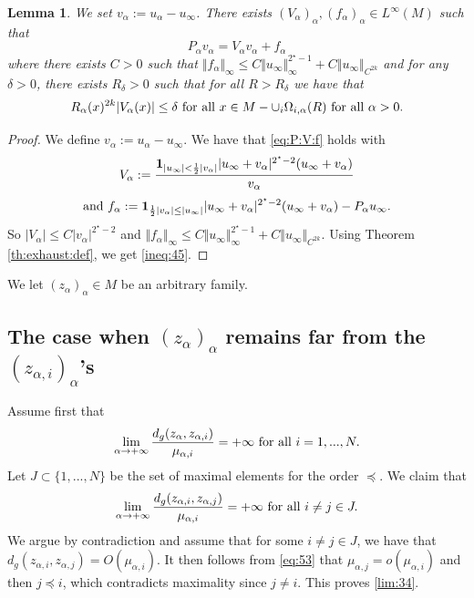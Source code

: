 \documentclass[reqno]{amsart}
\newtheorem{lemma}{Lemma}[section]
\def \crit {2^\star}
\def \ua {u_\alpha}
\def \va {v_\alpha}
\def \za {z_\alpha}
\def \mai {\mu_{\alpha,i}}
\def \maj {\mu_{\alpha,j}}
\def \zai {z_{\alpha,i}}
\def \zaj {z_{\alpha,j}}
\begin{document}
\begin{lemma}\label{step:34} We set $v_\alpha:=\ua-u_\infty $. There exists $(V_\alpha)_\alpha, (f_\alpha)_\alpha\in L^\infty(M)$ such that
\begin{equation}\label{eq:P:V:f}
P_\alpha v_\alpha= V_\alpha v_\alpha+f_\alpha
\end{equation}
where there exists $C>0$ such that $\Vert f_\alpha\Vert_\infty\leq C\Vert u_\infty \Vert_\infty^{\crit-1}+C\Vert u_\infty \Vert_{C^{2k}}$ and for  any $\delta>0$, there exists $R_\delta>0$ such that for all $R>R_\delta$ we have that
\begin{equation}\label{ineq:45}
R_\alpha(x)^{2k}|V_\alpha(x)|\leq \delta\hbox{ for all }x\in M-\cup_i\Omega_{i,\alpha}(R)\hbox{ for all }\alpha>0.
\end{equation}
\end{lemma}
\begin{proof} We define $v_\alpha:=\ua-u_\infty $. We  have that \eqref{eq:P:V:f} holds with
$$V_\alpha:=\frac{{\bf 1}_{|u_\infty |<\frac{1}{2}|v_\alpha|}|u_\infty +v_\alpha|^{\crit-2}(u_\infty +v_\alpha)}{v_\alpha}$$
$$\hbox{and }f_\alpha:={\bf 1}_{\frac{1}{2}|v_\alpha|\leq |u_\infty |}|u_\infty +v_\alpha|^{\crit-2}(u_\infty +v_\alpha)-P_\alpha u_\infty .$$
So $|V_\alpha|\leq C|\va|^{\crit-2}$ and $\Vert f_\alpha\Vert_\infty\leq C\Vert u_\infty \Vert_\infty^{\crit-1}+C\Vert u_\infty \Vert_{C^{2k}}$. Using Theorem \ref{th:exhaust:def}, we get  \eqref{ineq:45}.\end{proof}

\medskip\noindent We let $(\za)_\alpha\in M$ be an arbitrary family. 

\subsection{The case when $(\za)_\alpha$ remains far from the $(\zai)_\alpha$'s}Assume first that
\begin{equation}\label{choice:1}
\lim_{\alpha\to +\infty}\frac{d_g(\za,\zai)}{\mai}=+\infty\hbox{ for all }i=1,...,N.
\end{equation}
Let $J\subset \{1,...,N\}$ be the set of maximal elements  for the order $\preceq$. We claim that
\begin{equation}\label{lim:34}
\lim_{\alpha\to +\infty}\frac{d_g(\zai,\zaj)}{\mai}=+\infty\hbox{ for all }i\neq j\in J.
\end{equation}
We argue by contradiction and assume that for some $i\neq j\in J$, we have that $d_g(\zai,\zaj)=O(\mai)$. It then follows from \eqref{eq:53} that $\maj=o(\mai)$ and then $j\preceq i$, which contradicts maximality since $j\neq i$. This proves \eqref{lim:34}.
\end{document}
